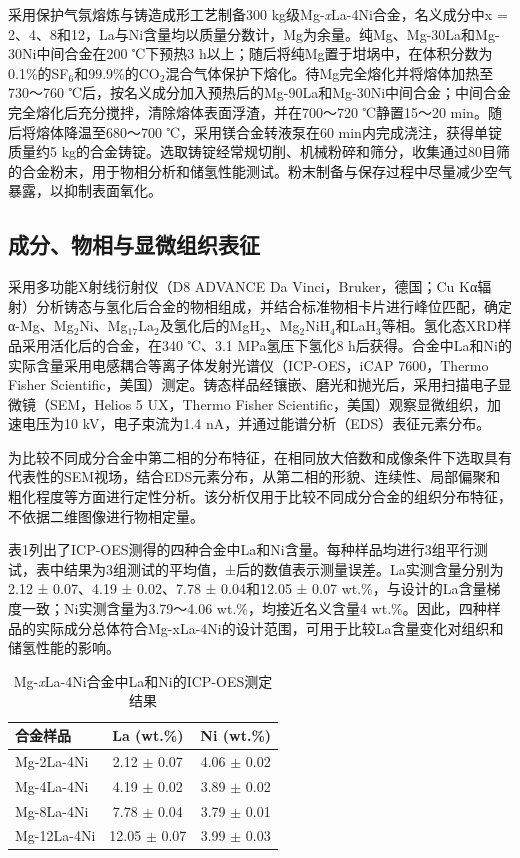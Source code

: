 \documentclass[preprint,12pt]{elsarticle}
\begin{document}
采用保护气氛熔炼与铸造成形工艺制备300 kg级Mg-\textit{x}La-4Ni合金，名义成分中x = 2、4、8和12，La与Ni含量均以质量分数计，Mg为余量。纯Mg、Mg-30La和Mg-30Ni中间合金在200 ℃下预热3 h以上；随后将纯Mg置于坩埚中，在体积分数为0.1\%的SF$_{\mathrm{6}}$和99.9\%的CO$_{\mathrm{2}}$混合气体保护下熔化。待Mg完全熔化并将熔体加热至730～760 ℃后，按名义成分加入预热后的Mg-90La和Mg-30Ni中间合金；中间合金完全熔化后充分搅拌，清除熔体表面浮渣，并在700～720 ℃静置15～20 min。随后将熔体降温至680～700 ℃，采用镁合金转液泵在60 min内完成浇注，获得单锭质量约5 kg的合金铸锭。选取铸锭经常规切削、机械粉碎和筛分，收集通过80目筛的合金粉末，用于物相分析和储氢性能测试。粉末制备与保存过程中尽量减少空气暴露，以抑制表面氧化。

\subsection{成分、物相与显微组织表征}

采用多功能X射线衍射仪（D8 ADVANCE Da Vinci，Bruker，德国；Cu Kα辐射）分析铸态与氢化后合金的物相组成，并结合标准物相卡片进行峰位匹配，确定α-Mg、Mg$_{\mathrm{2}}$Ni、Mg$_{\mathrm{17}}$La$_{\mathrm{2}}$及氢化后的MgH$_{\mathrm{2}}$、Mg$_{\mathrm{2}}$NiH$_{\mathrm{4}}$和LaH$_{\mathrm{3}}$等相。氢化态XRD样品采用活化后的合金，在340 ℃、3.1 MPa氢压下氢化8 h后获得。合金中La和Ni的实际含量采用电感耦合等离子体发射光谱仪（ICP-OES，iCAP 7600，Thermo Fisher Scientific，美国）测定。铸态样品经镶嵌、磨光和抛光后，采用扫描电子显微镜（SEM，Helios 5 UX，Thermo Fisher Scientific，美国）观察显微组织，加速电压为10 kV，电子束流为1.4 nA，并通过能谱分析（EDS）表征元素分布。

为比较不同成分合金中第二相的分布特征，在相同放大倍数和成像条件下选取具有代表性的SEM视场，结合EDS元素分布，从第二相的形貌、连续性、局部偏聚和粗化程度等方面进行定性分析。该分析仅用于比较不同成分合金的组织分布特征，不依据二维图像进行物相定量。

表1列出了ICP-OES测得的四种合金中La和Ni含量。每种样品均进行3组平行测试，表中结果为3组测试的平均值，±后的数值表示测量误差。La实测含量分别为2.12 ± 0.07、4.19 ± 0.02、7.78 ± 0.04和12.05 ± 0.07 wt.\%，与设计的La含量梯度一致；Ni实测含量为3.79～4.06 wt.\%，均接近名义含量4 wt.\%。因此，四种样品的实际成分总体符合Mg-xLa-4Ni的设计范围，可用于比较La含量变化对组织和储氢性能的影响。

\begin{table}[htbp]
\centering
\caption{Mg-\textit{x}La-4Ni合金中La和Ni的ICP-OES测定结果}
\label{tab:1}
\begingroup
\fontsize{9.5}{12}\selectfont
\renewcommand{\arraystretch}{1.12}
\begin{tabular}{lcc}
\toprule
合金样品 & La (wt.\%) & Ni (wt.\%) \\
\midrule
Mg-2La-4Ni & 2.12 $\pm$ 0.07 & 4.06 $\pm$ 0.02 \\
Mg-4La-4Ni & 4.19 $\pm$ 0.02 & 3.89 $\pm$ 0.02 \\
Mg-8La-4Ni & 7.78 $\pm$ 0.04 & 3.79 $\pm$ 0.01 \\
Mg-12La-4Ni & 12.05 $\pm$ 0.07 & 3.99 $\pm$ 0.03 \\
\bottomrule
\end{tabular}
\endgroup
\end{table}
\end{document}
